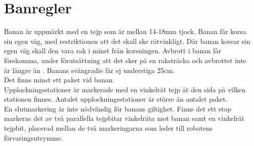 \section{Banregler} \label{banregler}

Banan är uppmärkt med en tejp som är mellan 14-18mm tjock. Banan får korsa sin egen väg, med restriktionen att det skall ske rätvinkligt. Där banan korsar sin egen väg skall den vara rak i minst \todo{10cm} från korsningen. Avbrott i banan får förekomma, under förutsättning att det sker på en raksträcka och avbrottet inte är längre än \todo{10 cm}. Banans svängradie får ej understiga 25cm. \\
Det finns minst ett paket vid banan. \\
Upplockningsstationer är markerade med en vinkelrät tejp åt den sida på vilken stationen finnes. Antalet upplockningsstationer är större än antalet paket. \\
En slutmarkering är inte nödvändig för banans giltighet. Finns det ett stop markeras det av två parallella tejpbitar vinkelräta mot banan samt en vinkelrät tejpbit, placerad mellan de två markeringarna som leder till robotens förvaringsutrymme.
